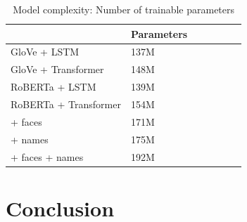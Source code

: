 \documentclass[10pt,twocolumn,letterpaper]{article}
\begin{document}
\begin{table}[t]
	\caption {Model complexity: Number of trainable parameters}
	\label{tab:models}
	\centering
	\begin{tabular}{lllllll}
		\toprule
        & Parameters \\
      \midrule
      GloVe + LSTM & 137M \\
      GloVe + Transformer & 148M \\
      RoBERTa + LSTM & 139M \\
      RoBERTa + Transformer & 154M \\
        + faces & 171M \\
        + names & 175M \\
        + faces + names & 192M \\
		\bottomrule
	\end{tabular}
\end{table}

\section{Conclusion}

{\small


}
\end{document}
